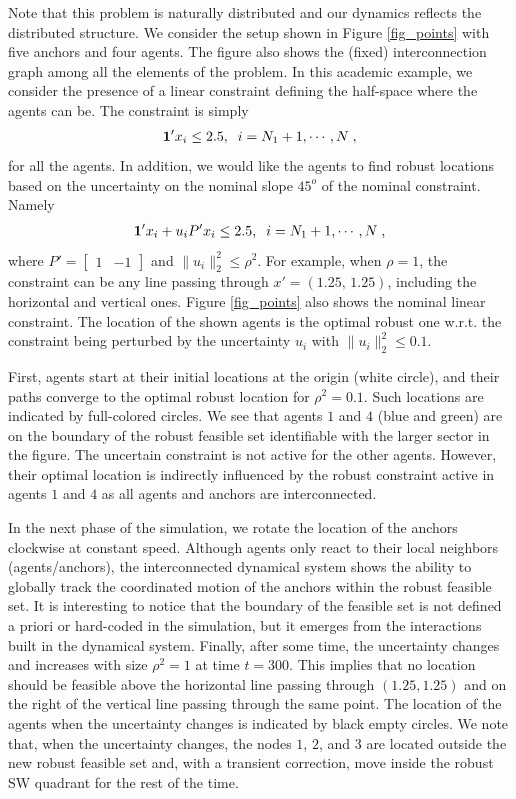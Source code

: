 \documentclass[journal,twoside,web]{ieeecolor}
\begin{document}
Note that this problem is naturally distributed and our dynamics reflects the distributed structure. We consider the setup shown in Figure \ref{fig_points} with five anchors and four agents. The figure also shows the (fixed) interconnection graph among all the elements of the problem. In this academic example, we consider the presence of a linear constraint defining the half-space where the agents can be. The constraint is simply
\begin{align*}
{\bf 1}'x_i\leq 2.5, \;\; i=N_1+1,\cdots,N\;,
\end{align*}
for all the agents. 
In addition, we would like the agents to find robust locations based on the uncertainty on the nominal slope $45^o$ of the nominal constraint. Namely 
\begin{align*}
{\bf 1}'x_i+u_iP'x_i\leq 2.5,\;\; i=N_1+1,\cdots,N\;,
\end{align*}
where $P'=\begin{bmatrix}1&-1\end{bmatrix}$ and $\|u_i\|_2^2\leq \rho^2$. For example, when $\rho=1$, the constraint can be any line passing through $x'=(1.25,\,1.25)$, including the horizontal and vertical ones. Figure \ref{fig_points} also shows the nominal linear constraint. The location of the shown agents is the optimal robust one w.r.t. the constraint being perturbed by the uncertainty $u_i$ with $\|u_i\|_2^2\leq 0.1$.


First, agents start at their initial locations at the origin (white circle), and their paths converge to the optimal robust location for $\rho^2=0.1$. Such locations are indicated by full-colored circles. We see that agents $1$ and $4$ (blue and green) are on the boundary of the robust feasible set identifiable with the larger sector in the figure. The uncertain constraint is not active for the other agents. However, their optimal location is indirectly influenced by the robust constraint active in agents $1$ and $4$ as all agents and anchors are interconnected. 

In the next phase of the simulation, we rotate the location of the anchors clockwise at constant speed. Although agents only react to their local neighbors (agents/anchors), the interconnected dynamical system shows the ability to globally track the coordinated motion of the anchors within the robust feasible set. It is interesting to notice that the boundary of the feasible set is not defined a priori or hard-coded in the simulation, but it emerges from the interactions built in the dynamical system. Finally, after some time, the uncertainty changes and increases with size $\rho^2=1$ at time $t=300$. This implies that no location should be feasible above the horizontal line passing through $(1.25,1.25)$ and on the right of the vertical line passing through the same point. The location of the agents when the uncertainty changes is indicated by black empty circles. We note that, when the uncertainty changes, the nodes $1$, $2$, and $3$ are located outside the new robust feasible set and, with a transient correction, move inside the robust SW quadrant for the rest of the time. 
\end{document}
